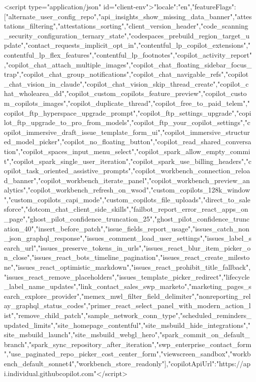   <script type="application/json" id="client-env">{"locale":"en","featureFlags":["alternate_user_config_repo","api_insights_show_missing_data_banner","attestations_filtering","attestations_sorting","client_version_header","code_scanning_security_configuration_ternary_state","codespaces_prebuild_region_target_update","contact_requests_implicit_opt_in","contentful_lp_copilot_extensions","contentful_lp_flex_features","contentful_lp_footnotes","copilot_activity_report","copilot_chat_attach_multiple_images","copilot_chat_floating_sidebar_focus_trap","copilot_chat_group_notifications","copilot_chat_navigable_refs","copilot_chat_vision_in_claude","copilot_chat_vision_skip_thread_create","copilot_chat_wholearea_dd","copilot_custom_copilots_feature_preview","copilot_custom_copilots_images","copilot_duplicate_thread","copilot_free_to_paid_telem","copilot_ftp_hyperspace_upgrade_prompt","copilot_ftp_settings_upgrade","copilot_ftp_upgrade_to_pro_from_models","copilot_ftp_your_copilot_settings","copilot_immersive_draft_issue_template_form_ui","copilot_immersive_structured_model_picker","copilot_no_floating_button","copilot_read_shared_conversation","copilot_spaces_input_menu_select","copilot_spark_allow_empty_commit","copilot_spark_single_user_iteration","copilot_spark_use_billing_headers","copilot_task_oriented_assistive_prompts","copilot_workbench_connection_reload_banner","copilot_workbench_iterate_panel","copilot_workbench_preview_analytics","copilot_workbench_refresh_on_wsod","custom_copilots_128k_window","custom_copilots_capi_mode","custom_copilots_file_uploads","direct_to_salesforce","dotcom_chat_client_side_skills","failbot_report_error_react_apps_on_page","ghost_pilot_confidence_truncation_25","ghost_pilot_confidence_truncation_40","insert_before_patch","issue_fields_report_usage","issues_catch_non_json_graphql_response","issues_comment_load_user_settings","issues_label_search_url","issues_preserve_tokens_in_urls","issues_react_blur_item_picker_on_close","issues_react_bots_timeline_pagination","issues_react_create_milestone","issues_react_optimistic_markdown","issues_react_prohibit_title_fallback","issues_react_remove_placeholders","issues_template_picker_redirect","lifecycle_label_name_updates","link_contact_sales_swp_marketo","marketing_pages_search_explore_provider","memex_mwl_filter_field_delimiter","nonreporting_relay_graphql_status_codes","primer_react_select_panel_with_modern_action_list","remove_child_patch","sample_network_conn_type","scheduled_reminders_updated_limits","site_homepage_contentful","site_msbuild_hide_integrations","site_msbuild_launch","site_msbuild_webgl_hero","spark_commit_on_default_branch","spark_sync_repository_after_iteration","swp_enterprise_contact_form","use_paginated_repo_picker_cost_center_form","viewscreen_sandbox","workbench_default_sonnet4","workbench_store_readonly"],"copilotApiUrl":"https://api.individual.githubcopilot.com"}</script>
